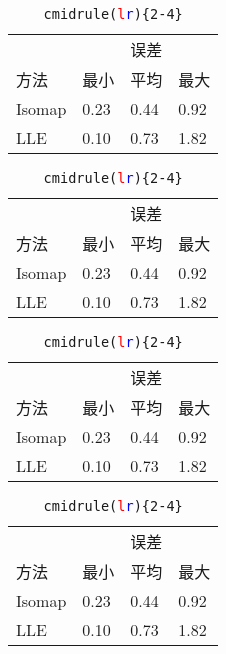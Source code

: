 \documentclass{article}
\begin{document}
\begin{table}[h]
    \begin{minipage}[t]{0.24\linewidth}
        \centering
        \begin{tabular}{@{}llll@{}} \toprule
            & \multicolumn{3}{c}{误差} \\ \cmidrule(){2-4}
            方法 & 最小 & 平均 & 最大     \\ \midrule
            Isomap & 0.23 & 0.44 & 0.92 \\
            LLE    & 0.10 & 0.73 & 1.82 \\ \bottomrule
        \end{tabular}
        \caption{\texttt{cmidrule()\{2-4\}}}
        \label{tbl:cmidrule1}
    \end{minipage}
    \hfill
    \begin{minipage}[t]{0.24\linewidth}
        \centering
        \begin{tabular}{@{}llll@{}} \toprule
            & \multicolumn{3}{c}{误差} \\ \cmidrule(l){2-4}
            方法 & 最小 & 平均 & 最大     \\ \midrule
            Isomap & 0.23 & 0.44 & 0.92 \\
            LLE    & 0.10 & 0.73 & 1.82 \\ \bottomrule
        \end{tabular}
        \caption{\texttt{cmidrule(\textcolor{red}{l})\{2-4\}}}
        \label{tbl:cmidrule2}
    \end{minipage}
    \hfill
    \begin{minipage}[t]{0.24\linewidth}
        \centering
        \begin{tabular}{@{}llll@{}} \toprule
            & \multicolumn{3}{c}{误差} \\ \cmidrule(r){2-4}
            方法 & 最小 & 平均 & 最大     \\ \midrule
            Isomap & 0.23 & 0.44 & 0.92 \\
            LLE    & 0.10 & 0.73 & 1.82 \\ \bottomrule
        \end{tabular}
        \caption{\texttt{cmidrule(\textcolor{blue}{r})\{2-4\}}}
        \label{tbl:cmidrule3}
    \end{minipage}
    \hfill
    \begin{minipage}[t]{0.24\linewidth}
        \centering
        \begin{tabular}{@{}llll@{}} \toprule
            & \multicolumn{3}{c}{误差} \\ \cmidrule(lr){2-4}
            方法 & 最小 & 平均 & 最大     \\ \midrule
            Isomap & 0.23 & 0.44 & 0.92 \\
            LLE    & 0.10 & 0.73 & 1.82 \\ \bottomrule
        \end{tabular}
        \caption{\texttt{cmidrule(\textcolor{red}{l}\textcolor{blue}{r})\{2-4\}}}
        \label{tbl:cmidrule4}
    \end{minipage}
\end{table}
\end{document}
